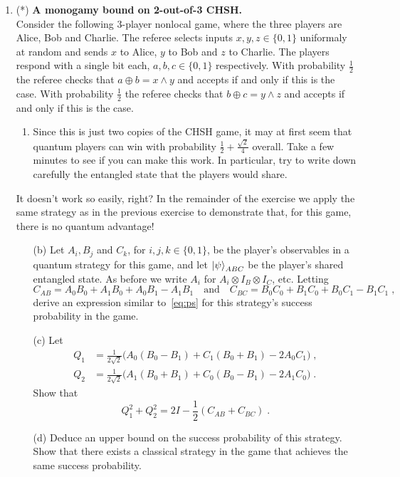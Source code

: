 \documentclass[12pt]{article}
\begin{document}
\begin{enumerate}
\item (*) \textbf{A monogamy bound on 2-out-of-3 CHSH. }\\
Consider the following $3$-player nonlocal game, where the three players are Alice, Bob and Charlie. The referee selects inputs $x,y,z\in\{0,1\}$ uniformaly at random and sends $x$ to Alice, $y$ to Bob and $z$ to Charlie. The players respond with a single bit each, $a,b,c\in\{0,1\}$ respectively. With probability $\frac12$ the referee checks that $a\oplus b = x\wedge y$ and accepts if and only if this is the case. With probability $\frac12$ the referee checks that $b\oplus c = y\wedge z$ and accepts if and only if this is the case. 
\begin{enumerate}
\item Since this is just two copies of the CHSH game, it may at first seem that quantum players can win with probability $\frac12+\frac{\sqrt{2}}{4}$ overall. Take a few minutes to see if you can make this work. In particular, try to write down carefully the entangled state that the players would share. 
\end{enumerate}
It doesn't work so easily, right? In the remainder of the exercise we apply the same strategy as in the previous exercise to demonstrate that, for this game, there is no quantum advantage!
\begin{enumerate}
\item[(b)] Let $A_i, B_j$ and $C_k$, for $i,j,k\in\{0,1\}$, be the player's  observables in a quantum strategy for this game, and let $\ket{\psi}_{ABC}$ be the player's shared entangled state. As before we write $A_i$ for $A_i\otimes I_B\otimes I_C$, etc. Letting 
\[C_{AB} = A_0B_0 + A_1B_0 + A_0B_1-A_1B_1\quad\text{and}\quad C_{BC} = B_0C_0 + B_1C_0 + B_0C_1-B_1C_1\;,\]
derive an expression similar to~\eqref{eq:ps} for this strategy's success probability in the game. 
\item[(c)] Let 
\begin{align*}
Q_1 &= \frac{1}{2\sqrt{2}}\big( A_0(B_0-B_1)+C_1(B_0+B_1)-2A_0C_1\big)\;,\\
Q_2 &= \frac{1}{2\sqrt{2}}\big( A_1(B_0+B_1)+C_0(B_0-B_1)-2A_1C_0\big)\;.
\end{align*}
Show that
\[ Q_1^2+Q_2^2 = 2I-\frac{1}{2}(C_{AB}+C_{BC})\;.\]
\item[(d)] Deduce an upper bound on the success probability of this strategy. Show that there exists a classical strategy in the game that achieves the same success probability. 
\end{enumerate}
\end{enumerate}
\end{document}
